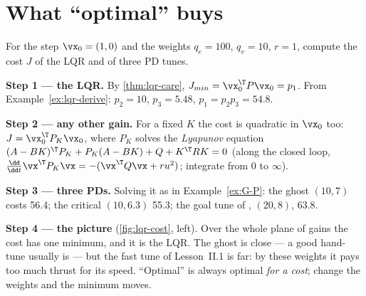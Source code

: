 \section{What \enquote{optimal} buys}

\begin{example}
\label{ex:lqr-cost}
For the step $\vx_0 = (1, 0)$ and the weights $q_e = 100$, $q_v = 10$, $r = 1$, compute the cost $J$ of the LQR and of three PD tunes.

\textbf{Step 1 — the LQR.} By \cref{thm:lqr-care}, $J_{min} = \vx_0^\T P\vx_0 = p_1$. From Example~\ref{ex:lqr-derive}: $p_2 = 10$, $p_3 = 5.48$, $p_1 = p_2p_3 = 54.8$.

\textbf{Step 2 — any other gain.} For a fixed $K$ the cost is quadratic in $\vx_0$ too: $J = \vx_0^\T P_K\vx_0$, where $P_K$ solves the \emph{Lyapunov} equation $(A - BK)^\T P_K + P_K(A - BK) + Q + K^\T RK = 0$ (along the closed loop, $\frac{\dd}{\dd t}\vx^\T P_K\vx = -(\vx^\T Q\vx + ru^2)$; integrate from 0 to $\infty$).

\textbf{Step 3 — three PDs.} Solving it as in Example~\ref{ex:G-P}: the ghost $(10, 7)$ costs 56.4; the critical $(10, 6.3)$ 55.3; the goal tune of , $(20, 8)$, 63.8.

\textbf{Step 4 — the picture} (\cref{fig:lqr-cost}, left). Over the whole plane of gains the cost has one minimum, and it is the LQR. The ghost is close — a good hand-tune usually is — but the fast tune of Lesson~II.1 is far: by these weights it pays too much thrust for its speed. \enquote{Optimal} is always optimal \emph{for a cost}; change the weights and the minimum moves.
\end{example}


